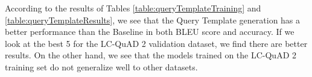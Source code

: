 \begin{table}[h!]
    \centering
    \caption{BLEU score and accuracy for the Query Template generation task.}
    \label{table:queryTemplateResults}
\end{table}

According to the results of Tables \ref{table:queryTemplateTraining} and \ref{table:queryTemplateResults}, 
we see that the Query Template generation has a better performance than the Baseline in both 
BLEU score and accuracy. If we look at the best 5 for the LC-QuAD 2 validation dataset, we find 
there are better results. On the other hand, we see that the models trained on the LC-QuAD 2 
training set do not generalize well to other datasets.

